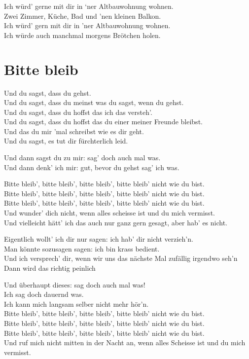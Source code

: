 \documentclass[]{book}
\begin{document}
Ich würd' gerne mit dir in `ner Altbauwohnung wohnen.\\
Zwei Zimmer, Küche, Bad und 'nen kleinen Balkon.\\
Ich würd' gern mit dir in 'ner Altbauwohnung wohnen.\\
Ich würde auch manchmal morgens Brötchen holen.

\hypertarget{bitte-bleib-2}{%
\section{Bitte bleib}\label{bitte-bleib-2}}

Und du sagst, dass du gehst.\\
Und du sagst, dass du meinst was du sagst, wenn du gehst.\\
Und du sagst, dass du hoffst das ich das versteh'.\\
Und du sagst, dass du hoffst das du einer meiner Freunde bleibst.\\
Und das du mir 'mal schreibst wie es dir geht.\\
Und du sagst, es tut dir fürchterlich leid.

Und dann sagst du zu mir: sag' doch auch mal was.\\
Und dann denk' ich mir: gut, bevor du gehst sag' ich was.

Bitte bleib', bitte bleib', bitte bleib', bitte bleib' nicht wie du bist.\\
Bitte bleib', bitte bleib', bitte bleib', bitte bleib' nicht wie du bist.\\
Bitte bleib', bitte bleib', bitte bleib', bitte bleib' nicht wie du bist.\\
Und wunder' dich nicht, wenn alles scheisse ist und du mich vermisst.\\
Und vielleicht hätt' ich das auch nur ganz gern gesagt, aber hab' es nicht.

Eigentlich wollt' ich dir nur sagen: ich hab' dir nicht verzieh'n.\\
Man könnte sozusagen sagen: ich bin krass bedient.\\
Und ich versprech' dir, wenn wir uns das nächste Mal zufällig irgendwo seh'n\\
Dann wird das richtig peinlich

Und überhaupt dieses: sag doch auch mal was!\\
Ich sag doch dauernd was.\\
Ich kann mich langsam selber nicht mehr hör'n.\\
Bitte bleib', bitte bleib', bitte bleib', bitte bleib' nicht wie du bist.\\
Bitte bleib', bitte bleib', bitte bleib', bitte bleib' nicht wie du bist.\\
Bitte bleib', bitte bleib', bitte bleib', bitte bleib' nicht wie du bist.\\
Und ruf mich nicht mitten in der Nacht an, wenn alles Scheisse ist und du mich vermisst.
\end{document}
